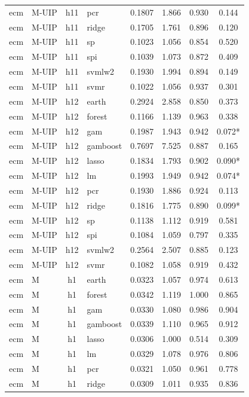 \begin{ThreePartTable}
\begin{longtable}[t]{llclcccc}
ecm & M-UIP & h11 & pcr & 0.1807 & 1.866 & 0.930 & 0.144\\
ecm & M-UIP & h11 & ridge & 0.1705 & 1.761 & 0.896 & 0.120\\
ecm & M-UIP & h11 & sp & 0.1023 & 1.056 & 0.854 & 0.520\\
ecm & M-UIP & h11 & spi & 0.1039 & 1.073 & 0.872 & 0.409\\
ecm & M-UIP & h11 & svmlw2 & 0.1930 & 1.994 & 0.894 & 0.149\\
ecm & M-UIP & h11 & svmr & 0.1022 & 1.056 & 0.937 & 0.301\\
\addlinespace
ecm & M-UIP & h12 & earth & 0.2924 & 2.858 & 0.850 & 0.373\\
ecm & M-UIP & h12 & forest & 0.1166 & 1.139 & 0.963 & 0.338\\
ecm & M-UIP & h12 & gam & 0.1987 & 1.943 & 0.942 & 0.072*\\
ecm & M-UIP & h12 & gamboost & 0.7697 & 7.525 & 0.887 & 0.165\\
ecm & M-UIP & h12 & lasso & 0.1834 & 1.793 & 0.902 & 0.090*\\
ecm & M-UIP & h12 & lm & 0.1993 & 1.949 & 0.942 & 0.074*\\
ecm & M-UIP & h12 & pcr & 0.1930 & 1.886 & 0.924 & 0.113\\
ecm & M-UIP & h12 & ridge & 0.1816 & 1.775 & 0.890 & 0.099*\\
ecm & M-UIP & h12 & sp & 0.1138 & 1.112 & 0.919 & 0.581\\
ecm & M-UIP & h12 & spi & 0.1084 & 1.059 & 0.797 & 0.335\\
ecm & M-UIP & h12 & svmlw2 & 0.2564 & 2.507 & 0.885 & 0.123\\
ecm & M-UIP & h12 & svmr & 0.1082 & 1.058 & 0.919 & 0.432\\
\addlinespace
ecm & M & h1 & earth & 0.0323 & 1.057 & 0.974 & 0.613\\
ecm & M & h1 & forest & 0.0342 & 1.119 & 1.000 & 0.865\\
ecm & M & h1 & gam & 0.0330 & 1.080 & 0.986 & 0.904\\
ecm & M & h1 & gamboost & 0.0339 & 1.110 & 0.965 & 0.912\\
ecm & M & h1 & lasso & 0.0306 & 1.000 & 0.514 & 0.309\\
ecm & M & h1 & lm & 0.0329 & 1.078 & 0.976 & 0.806\\
ecm & M & h1 & pcr & 0.0321 & 1.050 & 0.961 & 0.778\\
ecm & M & h1 & ridge & 0.0309 & 1.011 & 0.935 & 0.836\\

\end{longtable}
\end{ThreePartTable}

